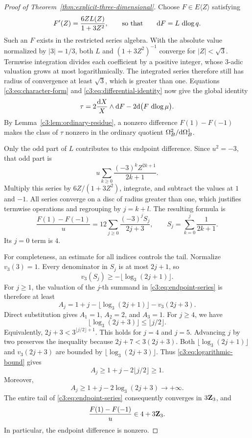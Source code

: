\begin{proof}[Proof of Theorem~\ref{thm:explicit-three-dimensional}]
Choose $F\in E\langle Z\rangle$ satisfying
\begin{equation}\label{c3:eq:primitive-derivative}
 F'(Z)=\frac{6ZL(Z)}{1+3Z^2},
 \qquad\text{so that}\qquad
 \mathrm{d} F=L\,\operatorname{dlog} q.
\end{equation}
Such an $F$ exists in the restricted series algebra.
With the absolute value normalized by $|3|=1/3$, both $L$ and
$(1+3Z^2)^{-1}$ converge for $|Z|<\sqrt3$.
Termwise integration divides each coefficient by a positive integer,
whose $3$-adic valuation grows at most logarithmically.
The integrated series therefore still has radius of convergence at
least $\sqrt3$, which is greater than one.
Equations \eqref{c3:eq:character-form} and
\eqref{c3:eq:differential-identity} now give the global identity
\begin{equation}\label{c3:eq:character-residue}
 \tau=
 2\frac{\mathrm{d} X}{X}\wedge\mathrm{d} F
       -2\mathrm{d}\bigl(F\,\operatorname{dlog}\mu\bigr).
\end{equation}
By Lemma~\ref{c3:lem:ordinary-residue}, a nonzero difference
$F(1)-F(-1)$ makes the class of $\tau$ nonzero in the ordinary
quotient $\Omega_B^2/\mathrm{d}\Omega_B^1$.

Only the odd part of $L$ contributes to this endpoint difference.
Since $u^2=-3$, that odd part is
\[
 u\sum_{k\geq0}\frac{(-3)^k Z^{2k+1}}{2k+1}.
\]
Multiply this series by $6Z/(1+3Z^2)$, integrate, and subtract the
values at $1$ and $-1$.
All series converge on a disc of radius greater than one, which
justifies termwise operations and regrouping by $j=k+l$.
The resulting formula is
\begin{equation}\label{c3:eq:endpoint-series}
 \frac{F(1)-F(-1)}{u}
   =12\sum_{j\geq0}\frac{(-3)^jS_j}{2j+3},
 \qquad
 S_j=\sum_{k=0}^j\frac1{2k+1}.
\end{equation}
Its $j=0$ term is $4$.

For completeness, an estimate for all indices controls the tail.
Normalize $v_3(3)=1$.
Every denominator in $S_j$ is at most $2j+1$, so
\[
 v_3(S_j)\geq-\lfloor\log_3(2j+1)\rfloor.
\]
For $j\geq1$, the valuation of the $j$-th summand in
\eqref{c3:eq:endpoint-series} is therefore at least
\[
 A_j=1+j-\lfloor\log_3(2j+1)\rfloor-v_3(2j+3).
\]
Direct substitution gives $A_1=1$, $A_2=2$, and $A_3=1$.
For $j\geq4$, we have
\begin{equation}\label{c3:eq:logarithmic-bound}
 \lfloor\log_3(2j+3)\rfloor\leq\lfloor j/2\rfloor.
\end{equation}
Equivalently, $2j+3<3^{\lfloor j/2\rfloor+1}$.
This holds for $j=4$ and $j=5$.
Advancing $j$ by two preserves the inequality because
$2j+7<3(2j+3)$.
Both $\lfloor\log_3(2j+1)\rfloor$ and $v_3(2j+3)$ are bounded by
$\lfloor\log_3(2j+3)\rfloor$.
Thus \eqref{c3:eq:logarithmic-bound} gives
\[
 A_j\geq1+j-2\lfloor j/2\rfloor\geq1.
\]
Moreover,
\[
 A_j\geq1+j-2\log_3(2j+3)\longrightarrow+\infty.
\]
The entire tail of \eqref{c3:eq:endpoint-series} consequently converges
in $3\mathbf{Z}_3$, and
\begin{equation}\label{c3:eq:endpoint-nonzero}
 \frac{F(1)-F(-1)}{u}\in4+3\mathbf{Z}_3.
\end{equation}
In particular, the endpoint difference is nonzero.


\end{proof}
